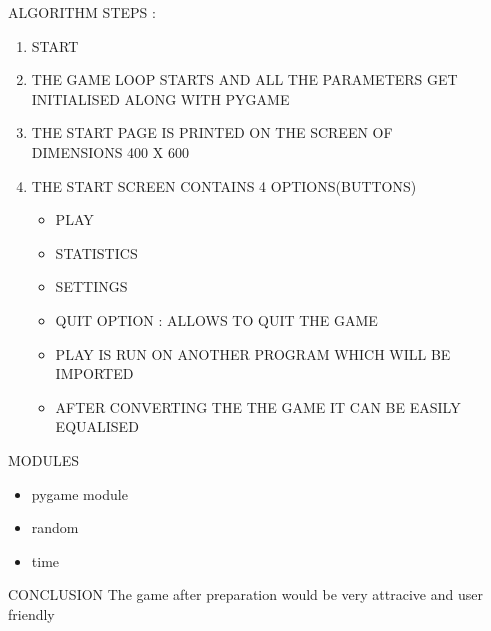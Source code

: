 \documentclass[11pt]{beamer}
\begin{document}
\begin{frame}{ALGORITHM}
STEPS : \\
\begin{enumerate}
\item START
\item THE GAME LOOP STARTS AND ALL THE PARAMETERS GET INITIALISED ALONG WITH PYGAME
\item THE START PAGE IS PRINTED ON THE SCREEN OF \\DIMENSIONS 400 X 600
\item THE START SCREEN CONTAINS 4 OPTIONS(BUTTONS)
\begin{itemize}
\item PLAY
\item STATISTICS
\item SETTINGS
\item QUIT OPTION : ALLOWS TO QUIT THE GAME
\item PLAY IS RUN ON ANOTHER PROGRAM WHICH WILL BE IMPORTED 
\item AFTER CONVERTING THE THE GAME IT CAN BE EASILY EQUALISED
\end{itemize}
\end{enumerate}
\end{frame}



\begin{frame}{MODULES}
\begin{itemize}
\item pygame module
\item random
\item time\\
\end{itemize}

\end{frame}


 
\begin{frame}{CONCLUSION}
The game after preparation would be very attracive and user friendly

\end{frame}
\end{document}
